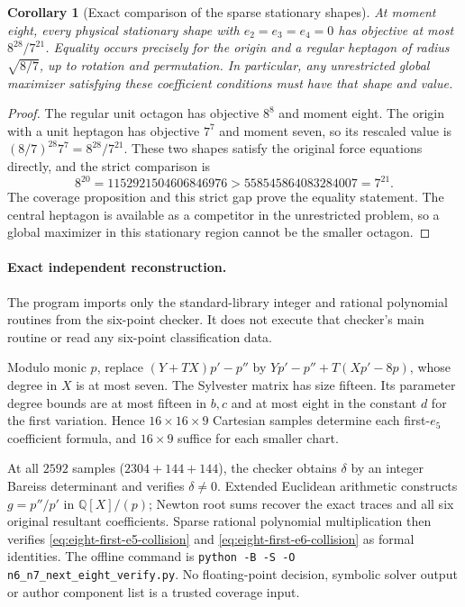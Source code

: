 \documentclass[11pt]{article}
\newtheorem{corollary}[theorem]{Corollary}
\theoremstyle{remark}
\numberwithin{equation}{section}
\begin{document}
\begin{corollary}[Exact comparison of the sparse stationary shapes]
\label{cor:eight-sparse-value}
At moment eight, every physical stationary shape with
$e_2=e_3=e_4=0$ has objective at most $8^{28}/7^{21}$.
Equality occurs precisely for the origin and a regular heptagon of
radius $\sqrt{8/7}$, up to rotation and permutation.
In particular, any unrestricted global maximizer satisfying these
coefficient conditions must have that shape and value.
\end{corollary}
\begin{proof}
The regular unit octagon has objective $8^8$ and moment eight.
The origin with a unit heptagon has objective $7^7$ and moment seven,
so its rescaled value is $(8/7)^{28}7^7=8^{28}/7^{21}$.
These two shapes satisfy the original force equations directly, and
the strict comparison is
\[
 8^{20}=1152921504606846976
 >558545864083284007=7^{21}.
\]
The coverage proposition and this strict gap prove the equality statement.
The central heptagon is available as a competitor in the unrestricted
problem, so a global maximizer in this stationary region cannot be the
smaller octagon.
\end{proof}

\paragraph{Exact independent reconstruction.}
The program  imports only the
standard-library integer and rational polynomial routines from the
six-point checker. It does not execute that checker's main routine or
read any six-point classification data.

Modulo monic $p$, replace $(Y+TX)p'-p''$ by
$Yp'-p''+T(Xp'-8p)$, whose degree in $X$ is at most seven.
The Sylvester matrix has size fifteen. Its parameter degree bounds are
at most fifteen in $b,c$ and at most eight in the constant $d$ for
the first variation. Hence $16\times16\times9$ Cartesian samples
determine each first-$e_5$ coefficient formula, and $16\times9$ suffice
for each smaller chart.

At all $2592$ samples ($2304+144+144$), the checker obtains $\delta$
by an integer Bareiss determinant and verifies $\delta\ne0$.
Extended Euclidean arithmetic constructs $g=p''/p'$ in
$\mathbb Q[X]/(p)$; Newton root sums recover the exact traces and all
six original resultant coefficients. Sparse rational polynomial
multiplication then verifies
\eqref{eq:eight-first-e5-collision} and
\eqref{eq:eight-first-e6-collision} as formal identities.
The offline command is
\texttt{python -B -S -O n6\_n7\_next\_eight\_verify.py}.
No floating-point decision, symbolic solver output or author component
list is a trusted coverage input.
\end{document}
